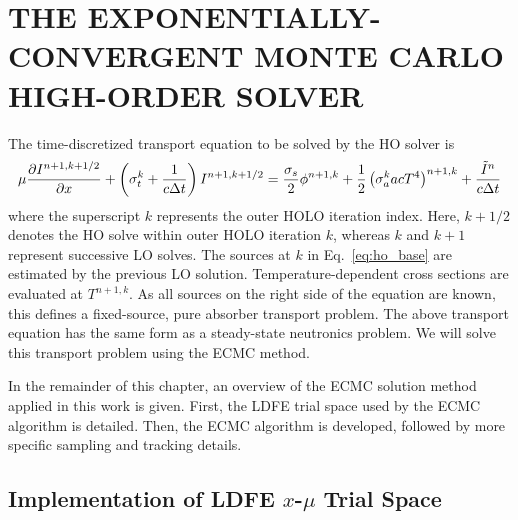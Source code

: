 
\chapter{\uppercase {The Exponentially-Convergent Monte Carlo High-Order Solver}}
\label{chp:ho}

The time-discretized transport equation to be solved by the HO solver is
\begin{equation}\label{eq:ho_base}
\mu \frac{\partial I^{n+1,k+1/2}}{\partial x} + \left(\sigma_t^k + \frac{1}{c \Delta t }\right)
I^{n+1,k+1/2}
= \frac{\sigma_s}{2} \phi^{n+1,k} +\frac{1}{2} \left(\sigma_a^k a c T^4
\right)^{n+1,k} + \frac{\tilde I^n}{c\Delta t} 
\end{equation}
where the superscript $k$ represents the outer HOLO iteration index.  Here, $k+1/2$ denotes the
HO solve within outer HOLO iteration $k$, whereas $k$ and $k+1$ represent successive LO
solves. The sources at $k$ in Eq.~\eqref{eq:ho_base} are estimated by the previous LO
solution. Temperature-dependent cross sections are
evaluated at $T^{n+1,k}$.  As all sources on the right side of the equation are known,
this defines a fixed-source, pure absorber transport problem.  The above transport equation has
the same form as a steady-state neutronics problem.  We will solve
this transport problem using the ECMC method. 

In the remainder of this chapter, an overview of
the ECMC solution method applied in this work is given.  First, the LDFE trial
space used by the ECMC algorithm is detailed.  Then, the ECMC algorithm is
developed, followed by more specific sampling and tracking details.  

\section{Implementation of LDFE $x$-$\mu$ Trial Space}

